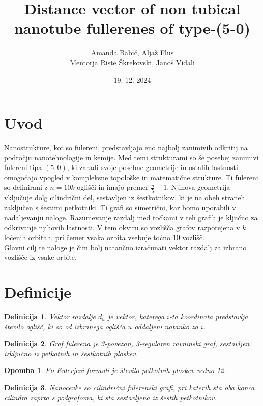 \documentclass[a4paper, 12pt]{article}
\title{
    Distance vector of non tubical nanotube fullerenes of type-(5-0)
}
\author{Amanda Babič, Aljaž Flus \\
        {\small Mentorja Riste Škrekovski, Janoš Vidali}}
\date{19. 12. 2024}
\newtheorem{definicija}{Definicija}[section]
\newtheorem{opomba}{Opomba}[section]
\begin{document}
\maketitle
\section{Uvod}

Nanostrukture, kot so fulereni, predstavljajo eno najbolj zanimivih odkritij na področju nanotehnologije in kemije. Med temi strukturami so še posebej zanimivi fulereni tipa $(5,0)$, ki zaradi svoje posebne geometrije in ostalih lastnosti omogočajo vpogled v kompleksne topološke in matematične strukture.  
Ti fulereni so definirani z $n=10k$ oglišči in imajo premer $\frac{n}{5}-1$. 
Njihova geometrija vključuje dolg cilindrični del, sestavljen iz šestkotnikov, ki je na obeh straneh zaključen s šestimi petkotniki.  
Ti grafi so simetrični, kar bomo uporabili v nadaljevanju naloge. Razumevanje razdalj med točkami v teh grafih je ključno za odkrivanje njihovih lastnosti. V tem okviru so vozlišča grafov razporejena v $k$ ločenih orbitah, pri čemer vsaka orbita vsebuje točno 10 vozlišč.  \\
Glavni cilj te naloge je čim bolj natančno izračunati vektor razdalj za izbrano vozlišče iz vsake orbite.

\section{Definicije}

\begin{definicija}
    Vektor razdalje $d_{u}$ je vektor, katerega $i$-ta koordinata predstavlja število oglišč, ki so od izbranega oglišča $u$ oddaljeni natanko za $i$. 
\end{definicija}

\begin{definicija}
    Graf fulerena je 3-povezan, 3-regularen ravninski graf, sestavljen izključno iz petkotnih in šestkotnih ploskev.
\end{definicija}

\begin{opomba}
    Po Eulerjevi formuli je število petkotnih ploskev vedno 12.
\end{opomba}

\begin{definicija}
    Nanocevke so cilindrični fulerenski grafi, pri katerih sta oba konca cilindra zaprta s podgrafoma, ki sta sestavljena iz šestih petkotnikov.
\end{definicija}
\end{document}
